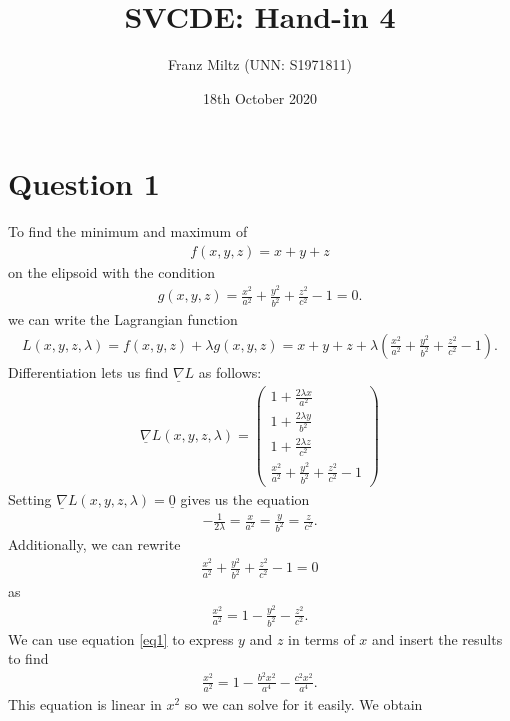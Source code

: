 \documentclass{article}
\newcommand{\grad}{\vec\nabla}
\renewcommand{\vec}{\underline}
\begin{document}
\title{SVCDE: Hand-in 4}
\author{Franz Miltz (UNN: S1971811)}
\date{18th October 2020}
\maketitle
\section*{Question 1}
To find the minimum and maximum of
\begin{align*}
  f(x,y,z)=x + y + z
\end{align*}
on the elipsoid with the condition
\begin{align*}
  g(x,y,z)=\frac{x^2}{a^2} + \frac{y^2}{b^2} + \frac{z^2}{c^2}-1=0.
\end{align*}
we can write the Lagrangian function
\begin{align*}
  L(x,y,z,\lambda) = f(x,y,z)+\lambda g(x,y,z) =  x + y + z + \lambda\left(\frac{x^2}{a^2}+\frac{y^2}{b^2}+\frac{z^2}{c^2}-1\right).
\end{align*}
Differentiation lets us find $\grad L$ as follows:
\begin{align*}
  \grad L(x,y,z,\lambda)=\begin{pmatrix}
    1+\frac{2\lambda x}{a^2}\\
    1+\frac{2\lambda y}{b^2}\\
    1+\frac{2\lambda z}{c^2}\\
    \frac{x^2}{a^2}+\frac{y^2}{b^2}+\frac{z^2}{c^2}-1
  \end{pmatrix}
\end{align*}
Setting $\grad L(x,y,z,\lambda)=\vec 0$ gives us the equation
\begin{align}
  \label{eq1}
  -\frac{1}{2\lambda} = \frac{x}{a^2} = \frac{y}{b^2} = \frac{z}{c^2}.
\end{align}
Additionally, we can rewrite
\begin{align*}
  \frac{x^2}{a^2}+\frac{y^2}{b^2}+\frac{z^2}{c^2}-1=0
\end{align*}
as
\begin{align*}
  \frac{x^2}{a^2}=1-\frac{y^2}{b^2}-\frac{z^2}{c^2}.
\end{align*}
We can use equation \ref{eq1} to express $y$ and $z$ in terms of $x$ and
insert the results to find
\begin{align*}
  \frac{x^2}{a^2}=1-\frac{b^2x^2}{a^4}-\frac{c^2x^2}{a^4}.
\end{align*}
This equation is linear in $x^2$ so we can solve for it easily. We obtain
\end{document}
